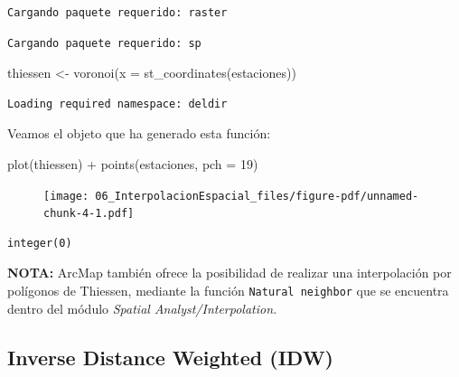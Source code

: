 \documentclass[
  letterpaper,
  DIV=11,
  numbers=noendperiod]{scrreprt}
\newenvironment{Shaded}{\begin{snugshade}}{\end{snugshade}}
\newcommand{\AttributeTok}[1]{\textcolor[rgb]{0.40,0.45,0.13}{#1}}
\newcommand{\DecValTok}[1]{\textcolor[rgb]{0.68,0.00,0.00}{#1}}
\newcommand{\FunctionTok}[1]{\textcolor[rgb]{0.28,0.35,0.67}{#1}}
\newcommand{\NormalTok}[1]{\textcolor[rgb]{0.00,0.23,0.31}{#1}}
\newcommand{\OtherTok}[1]{\textcolor[rgb]{0.00,0.23,0.31}{#1}}
\newcommand{\SpecialCharTok}[1]{\textcolor[rgb]{0.37,0.37,0.37}{#1}}
\begin{document}
\begin{verbatim}
Cargando paquete requerido: raster
\end{verbatim}

\begin{verbatim}
Cargando paquete requerido: sp
\end{verbatim}

\begin{Shaded}
\begin{Highlighting}[]
\NormalTok{thiessen }\OtherTok{\textless{}{-}} \FunctionTok{voronoi}\NormalTok{(}\AttributeTok{x =} \FunctionTok{st\_coordinates}\NormalTok{(estaciones))}
\end{Highlighting}
\end{Shaded}

\begin{verbatim}
Loading required namespace: deldir
\end{verbatim}

Veamos el objeto que ha generado esta función:

\begin{Shaded}
\begin{Highlighting}[]
\FunctionTok{plot}\NormalTok{(thiessen) }\SpecialCharTok{+}
\FunctionTok{points}\NormalTok{(estaciones, }\AttributeTok{pch =} \DecValTok{19}\NormalTok{)}
\end{Highlighting}
\end{Shaded}

\begin{figure}[H]

{\centering \texttt{[image: 06\_InterpolacionEspacial\_files/figure-pdf/unnamed-chunk-4-1.pdf]}

}

\end{figure}

\begin{verbatim}
integer(0)
\end{verbatim}

\leavevmode{}%
\textbf{NOTA:} ArcMap también ofrece la posibilidad de realizar una
interpolación por polígonos de Thiessen, mediante la función
\texttt{Natural\ neighbor} que se encuentra dentro del módulo
\emph{Spatial Analyst/Interpolation.}

\hypertarget{inverse-distance-weighted-idw}{%
\subsection{Inverse Distance Weighted
(IDW)}\label{inverse-distance-weighted-idw}}
\end{document}
